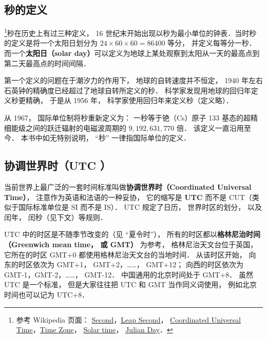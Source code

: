 
\begin{issues}
\end{issues}

\subsection{秒的定义}
\footnote{参考 Wikipedia 页面： \href{https://en.wikipedia.org/wiki/Second}{Second}，\href{https://en.wikipedia.org/wiki/Leap_second}{Leap Second}， \href{https://en.wikipedia.org/wiki/Coordinated_Universal_Time}{Coordinated Universal Time}，\href{https://en.wikipedia.org/wiki/Time_zone}{Time Zone}， \href{https://en.wikipedia.org/wiki/Solar_time}{Solar time}， \href{https://en.wikipedia.org/wiki/Julian_day}{Julian Day}．}秒在历史上有过三种定义， 16 世纪末开始出现以秒为最小单位的钟表．当时秒的定义是将一个太阳日划分为 $24\times60\times60 = 86400$ 等分， 并定义每等分一秒． 而一个\textbf{太阳日（solar day）}可以定义为地球上某处观察到太阳从一天的最高点到第二天最高点的时间间隔．

第一个定义的问题在于潮汐力的作用下， 地球的自转速度并不恒定， 1940 年左右石英钟的精确度已经超过了地球自转所定义的秒． 科学家发现用地球的回归年定义秒更精确， 于是从 1956 年， 科学家使用回归年来定义秒（定义略）．

从 1967， 国际单位制将秒重新定义为： 一秒等于铯（Cs）原子 133 基态的超精细能级之间的跃迁辐射的电磁波周期的 $9,192,631,770$ 倍． 该定义一直沿用至今． 本书中如无特别说明， “秒” 一律指国际单位的定义．

\subsection{协调世界时（UTC ）}
当前世界上最广泛的一套时间标准叫做\textbf{协调世界时（Coordinated Universal Time）}， 注意作为英语和法语的一种妥协， 它的缩写是 \textbf{UTC} 而不是 CUT（类似于国际标准单位是 SI 而不是 IS）． UTC 规定了日历， 世界时区的划分， 以及闰年， 闰秒（见下文）等规则．

UTC 中的时区是不随季节改变的（见 “夏令时”）， 所有的时区都以\textbf{格林尼治时间（Greenwich mean time， 或 GMT）} 为参考， 格林尼治天文台位于英国， 它所在的时区 GMT+0 都使用格林尼治天文台的当地时间． 从该时区开始， 向东的时区依次为 GMT+1， GMT+2，……， GMT+12； 向西的时区依次为 GMT-1，GMT-2，……， GMT-12． 中国通用的北京时间处于 GMT+8． 虽然 UTC 是一个标准， 但是大家往往把 UTC 和 GMT 当作同义词使用， 例如北京时间也可以记为 UTC+8．

